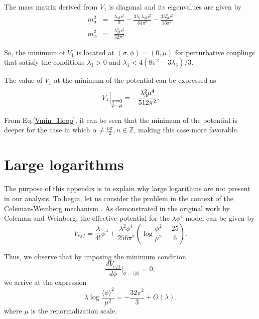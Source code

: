\documentclass[11pt,a4paper,english,superscriptaddress,preprint,aps,prd]{revtex4}
\begin{document}
The mass matrix derived from $V_1$ is diagonal and its eigenvalues are given by 
\begin{subequations}
\begin{eqnarray}
m^2_\sigma &=& \frac{\lambda_3\mu^2}{2} - \frac{3\lambda_1\lambda_3\mu^2}{64\pi^2} - \frac{3\lambda_3^2\mu^2}{16\pi^2}\\
m^2_\phi &=& \frac{\lambda_3^2\mu^2}{32\pi^2}. 
\end{eqnarray}
\end{subequations}

\noindent So, the minimum of $V_1$ is located at $(\sigma,\phi) = (0,\mu)$ for perturbative couplings that satisfy the conditions $\lambda_3 > 0$ and $\lambda_1 < 4(8\pi^2 - 3\lambda_3)/3$.

The value of $V_1$ at the minimum of the potential can be expressed as
\begin{eqnarray}
V_{1}\Big{|}_{\substack{\sigma=0\\ \phi=\mu}} = -\frac{\lambda_3^2 \mu ^4}{512 \pi ^2}.
\end{eqnarray}

\noindent From Eq.\eqref{Vmin_1loop}, it can be seen that the minimum of the potential is deeper for the case in which $\alpha \neq \frac{n\pi}{2}, n\in\mathbb{Z}$, making this case more favorable.

\section{Large logarithms}\label{LargeLogs}
The purpose of this appendix is to explain why large logarithms are not present in our analysis. To begin, let us consider the problem in the context of the Coleman-Weinberg mechanism \cite{Coleman:1973jx}. As demonstrated in the original work by Coleman and Weinberg, the effective potential for the $\lambda\phi^4$ model can be given by
\begin{equation}
 V_{eff} = \frac{\lambda}{4!}\phi^4 + \frac{\lambda^2\phi^4}{256\pi^2}\left(\log\frac{\phi^2}{\mu^2} - \frac{25}{6}\right).
\end{equation}

Thus, we observe that by imposing the minimum condition 
\begin{equation}\label{minimum}
 \frac{d V_{eff}}{d\phi}\Bigr|_{\phi = \langle\phi\rangle} = 0,
\end{equation}
we arrive at the expression
\begin{equation}
 \lambda\log\frac{\langle\phi\rangle^2}{\mu^2} = -\frac{32\pi^2}{3} + O(\lambda).
\end{equation}
\noindent  where $\mu$ is the renormalization scale.
\end{document}
